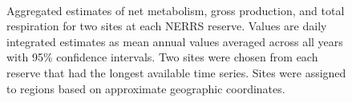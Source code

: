 \documentclass[10pt,letterpaper]{article}\usepackage[]{graphicx}\usepackage[]{color}
\newenvironment{knitrout}{}{} %
\begin{document}
\begin{knitrout}\small
{}\color{fgcolor}\begin{figure}[!h]

{\centering \includegraphics[width=0.00\textwidth]{figure/metab_plo-1} 

}

\caption[Aggregated estimates of net metabolism, gross production, and total respiration for two sites at each \gls{NERRS} reserve]{Aggregated estimates of net metabolism, gross production, and total respiration for two sites at each \gls{NERRS} reserve.  Values are daily integrated estimates as mean annual values averaged across all years with 95\% confidence intervals.  Two sites were chosen from each reserve that had the longest available time series. Sites were assigned to regions based on approximate geographic coordinates.}\label{fig:metab_plo}
\end{figure}


\end{knitrout}
\end{document}
